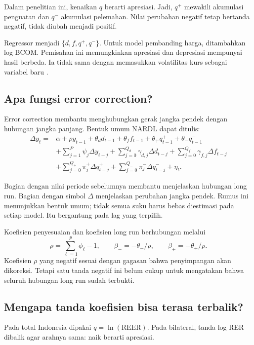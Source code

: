 Dalam penelitian ini, kenaikan $q$ berarti apresiasi. Jadi, $q^+$ mewakili akumulasi penguatan dan $q^-$ akumulasi pelemahan. Nilai perubahan negatif tetap bertanda negatif, tidak diubah menjadi positif.

Regressor menjadi $\{d,f,q^+,q^-\}$. Untuk model pembanding harga, ditambahkan log BCOM. Pemisahan ini memungkinkan apresiasi dan depresiasi mempunyai hasil berbeda. Ia tidak sama dengan memasukkan volatilitas kurs sebagai variabel baru \cite{shin}.

\subsection{Apa fungsi error correction?}
Error correction membantu menghubungkan gerak jangka pendek dengan hubungan jangka panjang. Bentuk umum NARDL dapat ditulis:
\begin{align}
\Delta y_t={}&\alpha+\rho y_{t-1}+\theta_d d_{t-1}+\theta_f f_{t-1}
 +\theta_+q^+_{t-1}+\theta_-q^-_{t-1}\nonumber\\
 &+\sum_{j=1}^{P}\psi_j\Delta y_{t-j}
 +\sum_{j=0}^{Q_d}\gamma_{d,j}\Delta d_{t-j}
 +\sum_{j=0}^{Q_f}\gamma_{f,j}\Delta f_{t-j}\nonumber\\
 &+\sum_{j=0}^{Q_+}\pi_j^+\Delta q^+_{t-j}
 +\sum_{j=0}^{Q_-}\pi_j^-\Delta q^-_{t-j}+\eta_t.
 \label{eq:ecm}
\end{align}

Bagian dengan nilai periode sebelumnya membantu menjelaskan hubungan long run. Bagian dengan simbol $\Delta$ menjelaskan perubahan jangka pendek. Rumus ini menunjukkan bentuk umum; tidak semua suku harus bebas diestimasi pada setiap model. Itu bergantung pada lag yang terpilih.

Koefisien penyesuaian dan koefisien long run berhubungan melalui
\begin{equation}
 \rho=\sum_{\ell=1}^{p}\phi_\ell-1,\qquad
 \beta_-=-\theta_-/\rho,\qquad \beta_+=-\theta_+/\rho.
\end{equation}
Koefisien $\rho$ yang negatif sesuai dengan gagasan bahwa penyimpangan akan dikoreksi. Tetapi satu tanda negatif ini belum cukup untuk mengatakan bahwa seluruh hubungan long run sudah terbukti.

\subsection{Mengapa tanda koefisien bisa terasa terbalik?}
Pada total Indonesia dipakai $q=\ln(\mathrm{REER})$. Pada bilateral, tanda log RER dibalik agar arahnya sama: naik berarti apresiasi.

